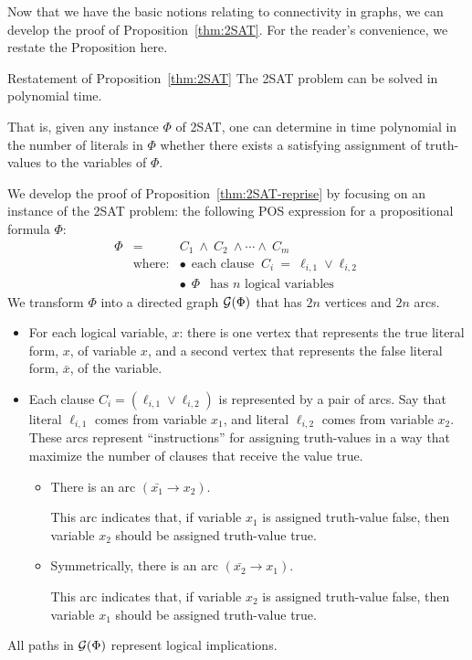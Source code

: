 Now that we have the basic notions relating to connectivity in graphs,
we can develop the proof of Proposition~\ref{thm:2SAT}.  For the
reader's convenience, we restate the Proposition here.

\begin{prop}{Restatement of Proposition~\ref{thm:2SAT}}
\label{thm:2SAT-reprise}
The {\sf 2SAT} problem can be solved in polynomial time.

\noindent
That is, given any instance $\Phi$ of {\sf 2SAT}, one can determine in
time polynomial in the number of literals in $\Phi$ whether there
exists a satisfying assignment of truth-values to the variables of
$\Phi$.
\end{prop}

We develop the proof of Proposition~\ref{thm:2SAT-reprise} by focusing
on an instance of the {\sf 2SAT} problem: the following POS expression
for a propositional formula $\Phi$:
\begin{eqnarray}
\label{eq:Phi-2SAT}
\Phi & = & C_1 \ \wedge \ C_2 \ \wedge \cdots \wedge \ C_m \\
\nonumber
  & \mbox{where:} & \bullet \ \ \mbox{each clause }
 \ C_i \ = \ \ell_{i,1} \vee \ell_{i,2} \\
\nonumber
  &               & \bullet \ \ \Phi \ \ \mbox{ has $n$ logical variables}
\end{eqnarray}
We transform $\Phi$ into a directed graph $\mbox{$\cal G$}(\Phi)$ that has $2n$
vertices and $2n$ arcs.
\begin{itemize}
\item
For each logical variable, $x$: there is one vertex that represents
the {\sc true} literal form, $x$, of variable $x$, and a second vertex
that represents the {\sc false} literal form, $\bar{x}$, of the
variable.
\item
Each clause $C_i = (\ell_{i,1} \vee \ell_{i,2})$ is represented by a
pair of arcs.  Say that literal $\ell_{i,1}$ comes from variable
$x_1$, and literal $\ell_{i,2}$ comes from variable $x_2$.  These arcs
represent ``instructions'' for assigning truth-values in a way that
maximize the number of clauses that receive the value {\sc true}.
  \begin{itemize}
  \item
There is an arc $(\bar{x_1} \rightarrow x_2)$.

This arc indicates that, if variable $x_1$ is assigned truth-value
{\sc false}, then variable $x_2$ should be assigned truth-value {\sc
  true}.
  \item
Symmetrically, there is an arc $(\bar{x_2} \rightarrow x_1)$.

This arc indicates that, if variable $x_2$ is assigned truth-value
{\sc false}, then variable $x_1$ should be assigned truth-value {\sc
  true}.
  \end{itemize}
\end{itemize}
All paths in $\mbox{$\cal G$}(\Phi)$ represent logical implications. 

